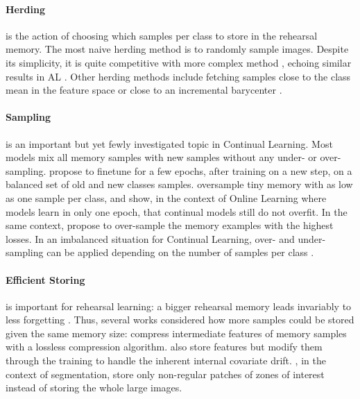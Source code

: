 \paragraph{Herding} is the action of choosing which samples per class to store in the rehearsal
memory. The most naive herding method is to randomly sample images. Despite its simplicity, it is
quite competitive with more complex method \citep{castro2018end_to_end_inc_learn}, echoing similar
results in \ac{AL} \citep{gal2017activelearning}. Other herding methods include fetching samples
close to the class mean in the feature space \citep{castro2018end_to_end_inc_learn} or close to an
incremental barycenter \citep{rebuffi2017icarl}.

\paragraph{Sampling} is an important but yet fewly investigated topic in Continual Learning. Most
models mix all memory samples with new samples without any under- or over-sampling.
\cite{castro2018end_to_end_inc_learn} propose to finetune for a few epochs, after training on a new
step, on a balanced set of old and new classes samples. \cite{chaudhry2019tinyepisodicmemories}
oversample tiny memory with as low as one sample per class, and show, in the context of Online
Learning where models learn in only one epoch, that continual models still do not overfit. In the
same context, \cite{aljundi2019maximallyinterfered} propose to over-sample the memory examples with
the highest losses. In an imbalanced situation for Continual Learning, over- and under-sampling can be
applied depending on the number of samples per class \citep{kim2020imbalancedcontinual}.

\paragraph{Efficient Storing} is important for rehearsal learning: a bigger rehearsal memory leads
invariably to less forgetting \citep{douillard2020podnet}. Thus, several works considered how more
samples could be stored given the same memory size: \cite{hayes2020remind} compress intermediate
features of memory samples with a lossless compression algorithm.
\cite{iscen2020incrementalfeatureadaptation} also store features but modify them through the
training to handle the inherent internal covariate drift. \cite{douillard2021objectrehearsal}, in
the context of segmentation, store only non-regular patches of zones of interest instead of storing
the whole large images.

